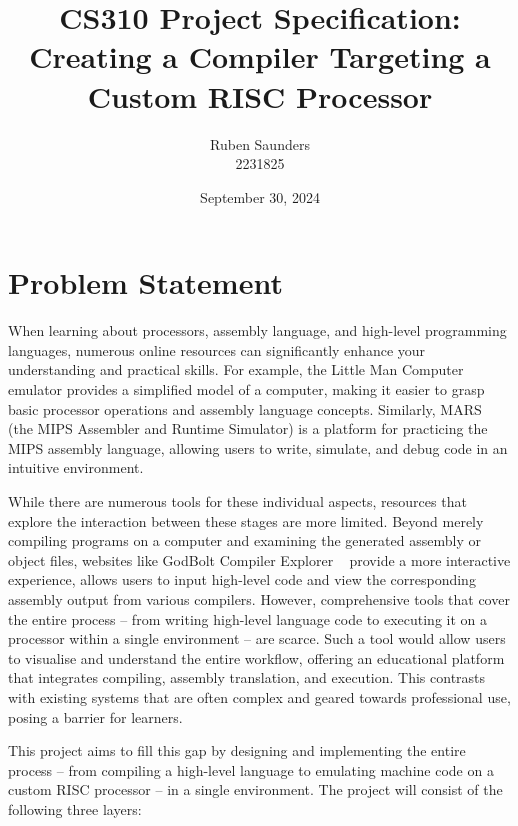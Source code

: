 \documentclass{article}
\begin{document}
    \title{CS310 Project Specification:\\Creating a Compiler Targeting a Custom RISC Processor}
    \author{Ruben Saunders\\2231825}
    \date{September 30, 2024}

    \maketitle

    \section{Problem Statement}\label{sec:problem-statement}

    When learning about processors, assembly language, and high-level programming languages, numerous online resources can significantly enhance your understanding and practical skills.
    For example, the Little Man Computer ~\cite{lmc} emulator provides a simplified model of a computer, making it easier to grasp basic processor operations and assembly language concepts.
    Similarly, MARS ~\cite{mars-simulator} (the MIPS Assembler and Runtime Simulator) is a platform for practicing the MIPS assembly language, allowing users to write, simulate, and debug code in an intuitive environment.

    While there are numerous tools for these individual aspects, resources that explore the interaction between these stages are more limited.
    Beyond merely compiling programs on a computer and examining the generated assembly or object files, websites like GodBolt Compiler Explorer ~\cite{godbolt} provide a more interactive experience, allows users to input high-level code and view the corresponding assembly output from various compilers.
    However, comprehensive tools that cover the entire process -- from writing high-level language code to executing it on a processor within a single environment -- are scarce.
    Such a tool would allow users to visualise and understand the entire workflow, offering an educational platform that integrates compiling, assembly translation, and execution.
    This contrasts with existing systems that are often complex and geared towards professional use, posing a barrier for learners.

    \medskip
    This project aims to fill this gap by designing and implementing the entire process -- from compiling a high-level language to emulating machine code on a custom RISC processor -- in a single environment.
    The project will consist of the following three layers:
\end{document}
